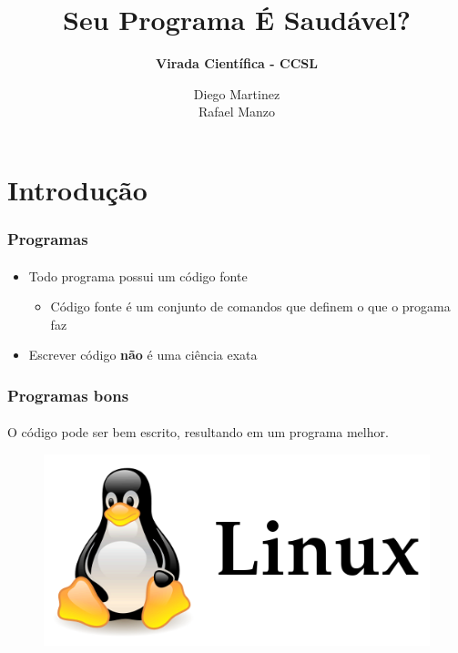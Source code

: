 \documentclass{beamer}
\title{
       \textbf{Seu Programa É Saudável?} \\
      }
\subtitle{
		\textbf{Virada Científica - CCSL}
		}
\author{Diego Martinez\\
        Rafael Manzo
       }
\begin{document}
\maketitle

\section{Introdução}

\begin{frame}
  \frametitle{Programas}
  \framesubtitle{}

  \begin{itemize}
    \item Todo programa possui um código fonte
    \begin{itemize}
      \item Código fonte é um conjunto de comandos que definem o que o progama faz
    \end{itemize}
    \item Escrever código \textbf{não} é uma ciência exata
  \end{itemize}

\end{frame}

\begin{frame}
  \frametitle{Programas bons}
  \framesubtitle{}

  O código pode ser bem escrito, resultando em um programa melhor.
  \begin{figure}
    \begin{center}
      \includegraphics[height=.5\textheight]{images/linux.png}
    \end{center}
  \end{figure}
\end{frame}
\end{document}
